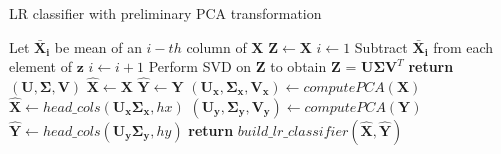 \documentclass[english,a4paper,twoside]{ppfcmthesis}
\begin{document}
\begin{algorithm}
    \caption{LR classifier with preliminary PCA transformation}\label{alg:pca1}
    \begin{algorithmic}[1]
    
        \State Let $\boldsymbol{\bar{X}_i}$ be mean of an $i-th$ column of $\boldsymbol{X}$
        \State $\boldsymbol{Z} \gets \boldsymbol{X}$
        \State $i \gets 1$
            \State Subtract $\boldsymbol{\bar{X}_i}$ from each element of $\boldsymbol{z}$ 
            \State $i \gets i+1$ 
        \EndFor
        \State Perform SVD on $\boldsymbol{Z}$ to obtain $\boldsymbol{Z}$ = $\boldsymbol{U}\boldsymbol{\Sigma}\boldsymbol{V}^T$
        \State \textbf{return} $(\boldsymbol{U}, \boldsymbol{\Sigma}, \boldsymbol{V})$
    \EndFunction
    \State
        \State $\boldsymbol{\hat{X}} \gets \boldsymbol{X}$ 
        \State $\boldsymbol{\hat{Y}} \gets \boldsymbol{Y}$ 
            \State $(\boldsymbol{U_x}, \boldsymbol{\Sigma_{x}}, \boldsymbol{V_x}) \gets  computePCA(\boldsymbol{X})$
            \State $\boldsymbol{\hat{X}} \gets head\_cols(\boldsymbol{U_x\Sigma_{x}}, hx)$
        \EndIf
            \State $(\boldsymbol{U_y}, \boldsymbol{\Sigma_{y}}, \boldsymbol{V_y}) \gets computePCA(\boldsymbol{Y})$
            \State $\boldsymbol{\hat{Y}} \gets head\_cols(\boldsymbol{U_y\Sigma_{y}}, hy)$
        \EndIf
        \State \textbf{return} $build\_lr\_classifier(\boldsymbol{\hat{X}}, \boldsymbol{\hat{Y}})$ 
    \EndFunction
    \end{algorithmic}
\end{algorithm}
\end{document}
